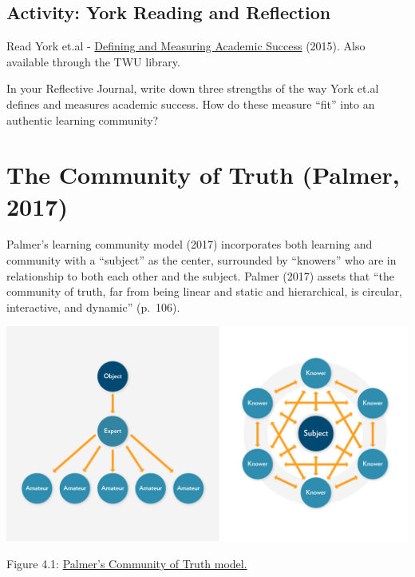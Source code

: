 \documentclass[
]{book}
\begin{document}
\hypertarget{activity-york-reading-and-reflection}{%
\subsection*{Activity: York Reading and Reflection}\label{activity-york-reading-and-reflection}}

\begin{reflect}
Read York et.al - \href{https://eric.ed.gov/?q=EJ1059739}{Defining and Measuring Academic Success} (2015). Also available through the TWU library.

In your Reflective Journal, write down three strengths of the way York et.al defines and measures academic success. How do these measure ``fit'' into an authentic learning community?
\end{reflect}

\hypertarget{the-community-of-truth-palmer-2017}{%
\section{The Community of Truth (Palmer, 2017)}\label{the-community-of-truth-palmer-2017}}

Palmer's learning community model (2017) incorporates both learning and community with a ``subject'' as the center, surrounded by ``knowers'' who are in relationship to both each other and the subject. Palmer (2017) assets that ``the community of truth, far from being linear and static and hierarchical, is circular, interactive, and dynamic'' (p.~106).

\includegraphics{assets/unit4/ParkerDiscussion.jpg}

Figure 4.1: \href{https://uncc.instructure.com/courses/342/pages/module-3-why-discussions}{Palmer's Community of Truth model.}
\end{document}
